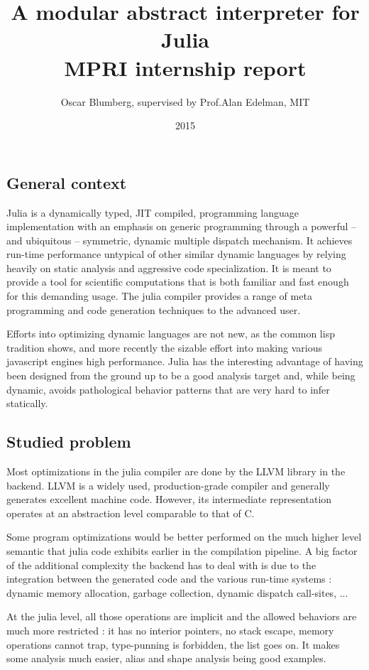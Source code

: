 \documentclass[11pt]{article}
\title{\vspace{-6ex}A modular abstract interpreter for Julia \\ MPRI internship report}
\author{Oscar Blumberg, supervised by Prof.\@ Alan Edelman, MIT}
\date{2015}
\begin{document}
\onehalfspacing
\maketitle
\thispagestyle{empty}
\vspace{1.5ex}
\subsection*{General context}

Julia is a dynamically typed, JIT compiled, programming language implementation with an emphasis on generic programming through a powerful -- and ubiquitous -- symmetric, dynamic multiple dispatch mechanism. It achieves run-time performance untypical of other similar dynamic languages by relying heavily on static analysis and aggressive code specialization. It is meant to provide a tool for scientific computations that is both familiar and fast enough for this demanding usage. The julia compiler provides a range of meta programming and code generation techniques to the advanced user.

Efforts into optimizing dynamic languages are not new, as the common lisp tradition shows, and more recently the sizable effort into making various javascript engines high performance. Julia has the interesting advantage of having been designed from the ground up to be a good analysis target and, while being dynamic, avoids pathological behavior patterns that are very hard to infer statically.

\subsection*{Studied problem}

Most optimizations in the julia compiler are done by the LLVM library in the backend. LLVM is a widely used, production-grade compiler and generally generates excellent machine code. However, its intermediate representation operates at an abstraction level comparable to that of C.

Some program optimizations would be better performed on the much higher level semantic that julia code exhibits earlier in the compilation pipeline. A big factor of the additional complexity the backend has to deal with is due to the integration between the generated code and the various run-time systems : dynamic memory allocation, garbage collection, dynamic dispatch call-sites, ...

At the julia level, all those operations are implicit and the allowed behaviors are much more restricted : it has no interior pointers, no stack escape, memory operations cannot trap, type-punning is forbidden, the list goes on. It makes some analysis much easier, alias and shape analysis being good examples.
\end{document}
